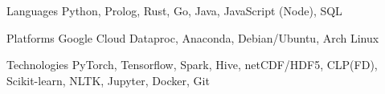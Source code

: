 \begin{cvskills}

\cvskill
    {Languages}
    {Python, Prolog, Rust, Go, Java, JavaScript (Node), SQL}

\cvskill
    {Platforms}
    {Google Cloud Dataproc, Anaconda, Debian/Ubuntu, Arch Linux}

\cvskill
    {Technologies}
    {PyTorch, Tensorflow, Spark, Hive, netCDF/HDF5, CLP(FD), Scikit-learn, NLTK, Jupyter, Docker, Git}

\end{cvskills}
